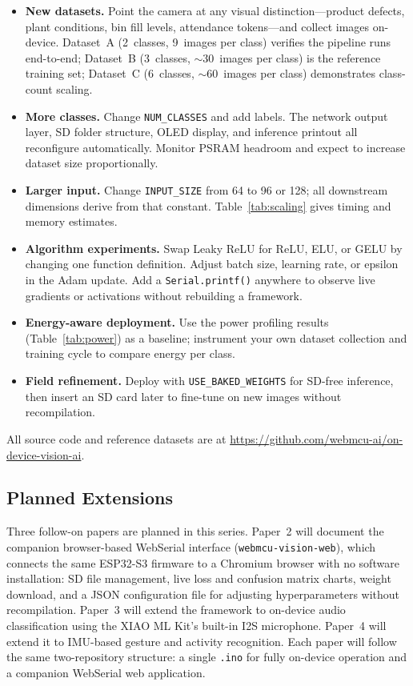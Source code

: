 \documentclass[12pt]{article}
\begin{document}
\begin{itemize}[nosep]
  \item \textbf{New datasets.} Point the camera at any visual
        distinction---product defects, plant conditions, bin fill levels,
        attendance tokens---and collect images on-device.
        Dataset~A (2~classes, 9~images per class) verifies the pipeline runs
        end-to-end; Dataset~B (3~classes, $\sim$30~images per class) is the
        reference training set; Dataset~C (6~classes, $\sim$60~images per class)
        demonstrates class-count scaling.
  \item \textbf{More classes.} Change \texttt{NUM\_CLASSES} and add labels.
        The network output layer, SD folder structure, OLED display, and
        inference printout all reconfigure automatically.
        Monitor PSRAM headroom and expect to increase dataset size
        proportionally.
  \item \textbf{Larger input.} Change \texttt{INPUT\_SIZE} from 64 to 96 or
        128; all downstream dimensions derive from that constant.
        Table~\ref{tab:scaling} gives timing and memory estimates.
  \item \textbf{Algorithm experiments.} Swap Leaky ReLU for ReLU, ELU, or
        GELU by changing one function definition.
        Adjust batch size, learning rate, or epsilon in the Adam update.
        Add a \texttt{Serial.printf()} anywhere to observe live gradients or
        activations without rebuilding a framework.
  \item \textbf{Energy-aware deployment.} Use the power profiling results
        (Table~\ref{tab:power}) as a baseline; instrument your own dataset
        collection and training cycle to compare energy per class.
  \item \textbf{Field refinement.} Deploy with \texttt{USE\_BAKED\_WEIGHTS}
        for SD-free inference, then insert an SD card later to fine-tune on
        new images without recompilation.
\end{itemize}

All source code and reference datasets are at
\url{https://github.com/webmcu-ai/on-device-vision-ai}.

\subsection{Planned Extensions}
\label{subsec:planned}

Three follow-on papers are planned in this series.
Paper~2 will document the companion browser-based WebSerial interface
(\texttt{webmcu-vision-web}), which connects the same ESP32-S3 firmware to a
Chromium browser with no software installation: SD file management, live loss
and confusion matrix charts, weight download, and a JSON configuration file for
adjusting hyperparameters without recompilation.
Paper~3 will extend the framework to on-device audio classification using the
XIAO ML Kit's built-in I2S microphone.
Paper~4 will extend it to IMU-based gesture and activity recognition.
Each paper will follow the same two-repository structure: a single
\texttt{.ino} for fully on-device operation and a companion WebSerial web
application.
\end{document}
